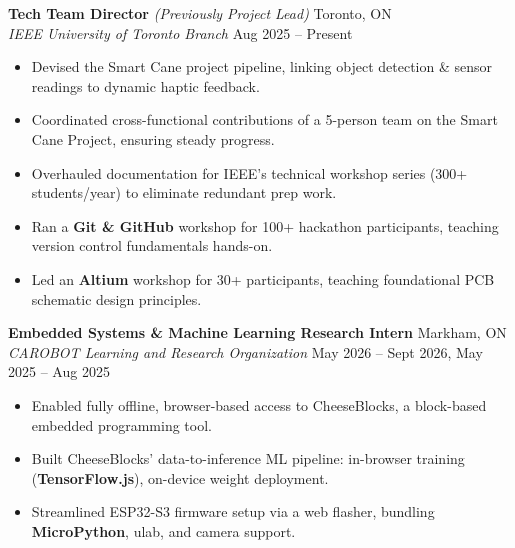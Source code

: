 \documentclass[10pt,letterpaper]{article}
\begin{document}
\textbf{Tech Team Director} \textit{(Previously Project Lead)} \hfill 
Toronto, ON \\
\textit{IEEE University of Toronto Branch} \hfill
Aug 2025 -- Present \\
\begin{itemize}
    \item Devised the Smart Cane project pipeline, linking object detection \& sensor readings to dynamic haptic feedback. 
    \item Coordinated cross-functional contributions of a 5-person team on the Smart Cane Project, ensuring steady progress. 
    \item Overhauled documentation for IEEE's technical workshop series (300+ students/year) to eliminate redundant prep work.
    \item Ran a \textbf{Git \& GitHub} workshop for 100+ hackathon participants, teaching version control fundamentals hands-on.
    \item Led an \textbf{Altium} workshop for 30+ participants, teaching foundational PCB schematic design principles.
\end{itemize}

\vspace{0.25em}
\textbf{Embedded Systems \& Machine Learning Research Intern} \hfill
Markham, ON \\
\textit{CAROBOT Learning and Research Organization} \hfill 
May 2026 -- Sept 2026, May 2025 -- Aug 2025 \\
\begin{itemize}
    \item Enabled fully offline, browser-based access to CheeseBlocks, a block-based embedded programming tool.
    \item Built CheeseBlocks' data-to-inference ML pipeline: in-browser training (\textbf{TensorFlow.js}), on-device weight deployment.
    \item Streamlined ESP32-S3 firmware setup via a web flasher, bundling \textbf{MicroPython}, ulab, and camera support.
\end{itemize}
\end{document}
